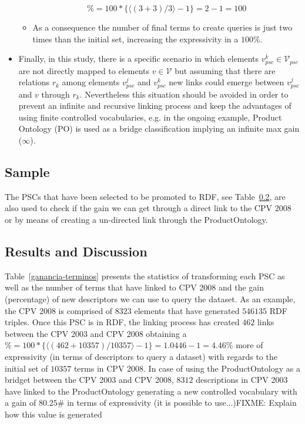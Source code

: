 \begin{itemize}
\begin{itemize}
  \begin{equation}
      \% = 100 * \{ \langle (3+3) / 3 \rangle -1 \} = 2-1 = 100 
  \end{equation}
      \item As a consequence the number of final terms to create queries is just two times than the initial set, increasing the expressivity in a $100\%$.
  \end{itemize}

 \item Finally, in this study, there is a specific scenario in which elements $v^k_{psc} \in \mathcal{V}_{psc}$ are not directly mapped to elements $v \in \mathcal{V}$ but 
 assuming that there are relations $r_k$  among elements $v^j_{psc}$  and $v^k_{psc}$ new links could emerge between $v^j_{psc}$ and $v$ through $r_k$. Nevertheless this 
 situation should be avoided in order to prevent an infinite and recursive linking process and keep the advantages of using finite controlled vocabularies, 
 e.g. in the ongoing example, Product Ontology (PO) is used as a bridge classification implying an infinite max gain ($\infty$).
 
\end{itemize}

\subsection{Sample}
The PSCs that have been selected to be promoted to RDF, see Table~\ref{}, are also used to check if the gain we can get through a direct link to the CPV 2008 or 
by means of creating a un-directed link through the ProductOntology.

 

\subsection{Results and Discussion}
Table~\ref{ganancia-terminos} presents the statistics of transforming each PSC as well as the number of terms that have linked to CPV 2008 and the gain (percentage) of 
new descriptors we can use to query the dataset. As an example, the CPV 2008 is comprised of $8323$ elements that have generated $546135$ RDF triples. 
Once this PSC is in RDF, the linking process has created $462$ links between the CPV 2003 and CPV 2008 obtaining a $\% = 100 * \{ \langle (462+10357) / 10357 \rangle -1 \} = 1.0446-1 = 4.46$\% more 
of expressivity (in terms of descriptors to query a dataset) with regards to the initial set of $10357$ terms in CPV 2008. In case of using the ProductOntology as a bridget 
between the CPV 2003 and CPV 2008, $8312$ descriptions in CPV 2003 have linked to the ProductOntology generating a new controlled vocabulary with a 
gain of $80.25$\# in terms of expressivity (it is possible to use...)FIXME: Explain how this value is generated


